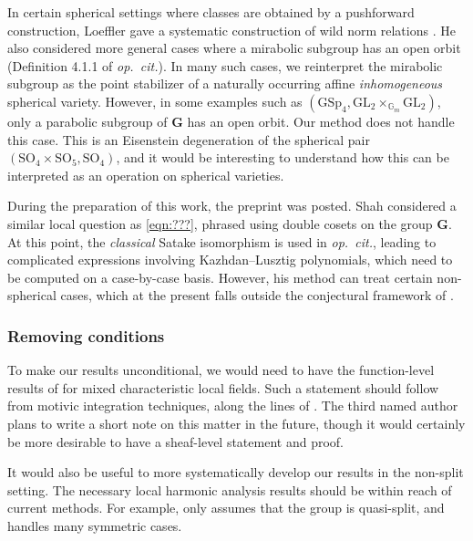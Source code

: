 \documentclass{amsart}
\theoremstyle{definition}
\theoremstyle{remark}
\newcommand{\1}{\mathbf{1}}
\newcommand{\G}{\mathbf{G}}
\newcommand{\GL}{\mathrm{GL}}
\newcommand{\mb}[1]{\mathbf{#1}}
\theoremstyle{definition}
\renewcommand{\G}{\mathbb{G}}
\newcommand{\bG}{\mathbf{G}}
\begin{document}
In certain spherical settings where classes are obtained by a pushforward construction, Loeffler gave a systematic construction of wild norm relations \cite{LoefflerSpherical}. He also considered more general cases where a mirabolic subgroup has an open orbit (Definition 4.1.1 of \emph{op.~cit.}). In many such cases, we reinterpret the mirabolic subgroup as the point stabilizer of a naturally occurring affine \emph{inhomogeneous} spherical variety. However, in some examples such as $(\mathrm{GSp}_4,\GL_2\times_{\G_m}\GL_2)$, only a parabolic subgroup of $\bG$ has an open orbit. Our method does not handle this case. This is an Eisenstein degeneration of the spherical pair $(\mathrm{SO}_4\times\mathrm{SO}_5,\mathrm{SO}_4)$, and it would be interesting to understand how this can be interpreted as an operation on spherical varieties.

During the preparation of this work, the preprint \cite{ShahZeta} was posted. Shah considered a similar local question as \eqref{eqn:???}, phrased using double cosets on the group $\mb{G}$. At this point, the \emph{classical} Satake isomorphism is used in \emph{op.~cit.}, leading to complicated expressions involving Kazhdan--Lusztig polynomials, which need to be computed on a case-by-case basis. However, his method can treat certain non-spherical cases, which at the present falls outside the conjectural framework of \cite{BZSV}.

\subsubsection{Removing conditions}\label{1.4.1}
To make our results unconditional, we would need to have the function-level results of \cite{SakWang} for mixed characteristic local fields. Such a statement should follow from motivic integration techniques, along the lines of \cite{CHL-FL}. The third named author plans to write a short note on this matter in the future, though it would certainly be more desirable to have a sheaf-level statement and proof.

It would also be useful to more systematically develop our results in the non-split setting. The necessary local harmonic analysis results should be within reach of current methods. For example, \cite{SakWang} only assumes that the group is quasi-split, and \cite{MurilloII} handles many symmetric cases.
\end{document}
